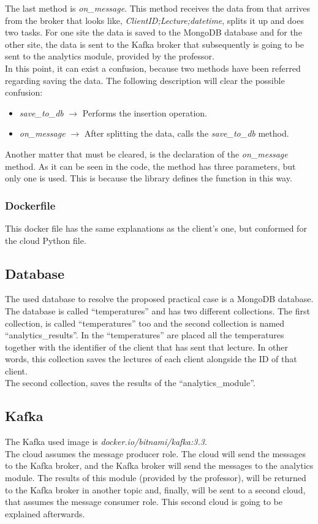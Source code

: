 \documentclass[a4paper,12pt]{article}
\begin{document}
The last method is \textit{on\_message}. This method receives the data from that arrives from the broker that looks like, \textit{ClientID;Lecture;datetime}, splits it up and does two tasks. For one site the data is saved to the MongoDB database and for the other site, the data is sent to the Kafka broker that subsequently is going to be sent to the analytics module, provided by the professor.\\
In this point, it can exist a confusion, because two methods have been referred regarding saving the data. The following description will clear the possible confusion:
\begin{itemize}
    \item \textit{save\_to\_db} $\longrightarrow$ Performs the insertion operation.
    \item \textit{on\_message} $\longrightarrow$ After splitting the data, calls the \textit{save\_to\_db} method.
\end{itemize}
Another matter that must be cleared, is the declaration of the \textit{on\_message} method. As it can be seen in the code, the method has three parameters, but only one is used. This is because the library defines the function in this way.

\subsubsection*{Dockerfile}
This docker file has the same explanations as the client's one, but conformed for the cloud Python file.

\subsection*{Database}
The used database to resolve the proposed practical case is a MongoDB database.\\
The database is called “temperatures” and has two different collections. The first collection, is called “temperatures” too and the second collection is named “analytics\_results”. In the “temperatures” are placed all the temperatures together with the identifier of the client that has sent that lecture. In other words, this collection saves the lectures of each client alongside the ID of that client.\\
The second collection, saves the results of the “analytics\_module”.

\subsection*{Kafka}
The Kafka used image is \textit{docker.io/bitnami/kafka:3.3}.\\
The cloud assumes the message producer role. The cloud will send the messages to the Kafka broker, and the Kafka broker will send the messages to the analytics module. The results of this module (provided by the professor), will be returned to the Kafka broker in another topic and, finally, will be sent to a second cloud, that assumes the message consumer role. This second cloud is going to be explained afterwards.
\end{document}
